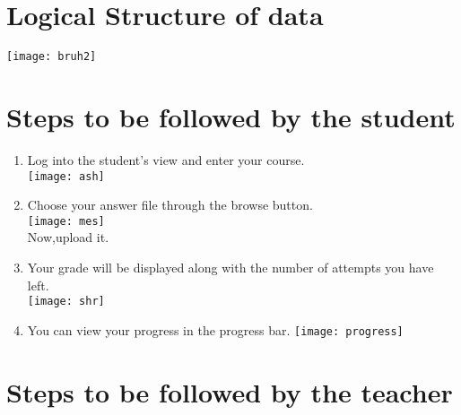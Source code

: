 \documentclass{scrreprt}
\begin{document}
\section{Logical Structure of data}
\texttt{[image: bruh2]}

\section{Steps to be followed by the student}

\begin{enumerate}
\item Log into the student's view and enter your course.\\
\texttt{[image: ash]}

\item Choose your answer file through the browse button.\\
\texttt{[image: mes]}
\\
Now,upload it.

\newpage 

\item Your grade will be displayed along with the number of attempts you have left.\\
\texttt{[image: shr]}

\item You can view your progress in the progress bar.
\newline
\texttt{[image: progress]}
\end{enumerate}

\newpage 

\section{Steps to be followed by the teacher}
\end{document}
